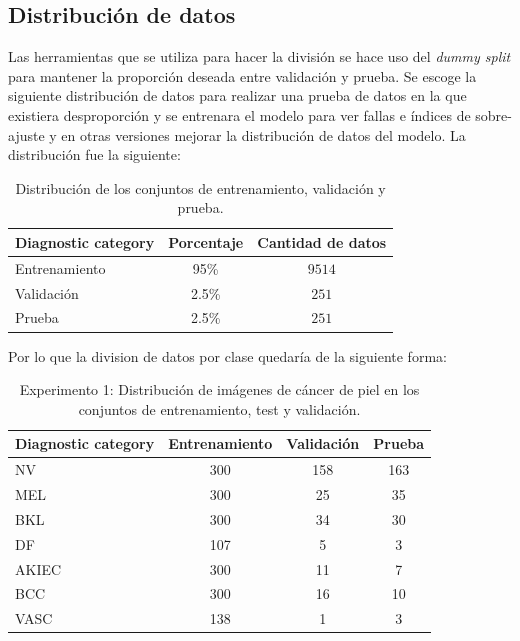 \subsection*{Distribución de datos}

Las herramientas que se utiliza para hacer la división se hace uso del \textit{dummy split}  para mantener la proporción deseada entre validación y prueba. Se escoge la siguiente distribución de datos para realizar una prueba de datos en la que existiera desproporción y se entrenara el modelo para ver fallas e índices de sobre-ajuste y en otras versiones mejorar la distribución de datos del modelo. La distribución fue la siguiente:

\begin{table}[H]
   \small
   \centering
   \begin{tabular}{lcc}
   \hline
   \textbf{Diagnostic category} & \textbf{Porcentaje} & \textbf{Cantidad de datos} \\
   \hline
   Entrenamiento       & 95\% & $9514$ \\
   Validación      & 2.5\% & $251$  \\
   Prueba      & 2.5\% & $251$  \\ \hline
   \end{tabular}
   \caption{Distribución de los conjuntos de entrenamiento, validación y prueba.}
   \label{table:data_distribution_e1}
   \end{table}

   Por lo que la division de datos por clase quedaría de la siguiente forma:

   \begin{table}[H]
      \small
      \centering
      \begin{tabular}{lccc}
      \hline
      \textbf{Diagnostic category} & \textbf{Entrenamiento} & \textbf{Validación} & \textbf{Prueba} \\
      \hline
      NV       & 300 & 158 & 163 \\
      MEL      & 300 & 25  & 35  \\
      BKL      & 300 & 34  & 30  \\
      DF       & 107 & 5   & 3   \\
      AKIEC    & 300 & 11  & 7   \\
      BCC      & 300 & 16  & 10  \\
      VASC     & 138 & 1   & 3   \\ \hline
      \end{tabular}
      \caption{Experimento 1: Distribución de imágenes de cáncer de piel en los conjuntos de entrenamiento, test y validación.}
      \label{table:train_test_validate_e1}
      \end{table}
   
